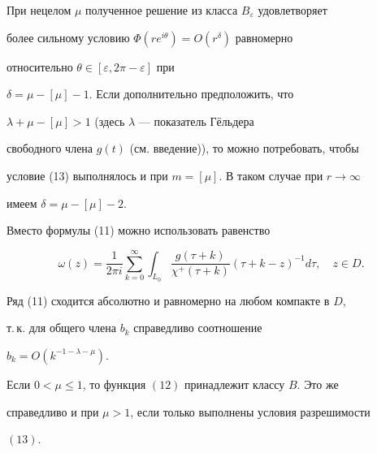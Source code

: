 


 


\begin{note} 


При нецелом $\mu$ полученное решение из класса $B_\varepsilon$ удовлетворяет 


более сильному условию $\Phi(re^{i\theta})=O(r^\delta)$ равномерно 


относительно $\theta\in[\varepsilon,2\pi-\varepsilon]$ при 


$\delta=\mu-[\mu]-1$. Если дополнительно предположить, что 


$\lambda+\mu-[\mu]>1$ (здесь $\lambda$ --- показатель Г\"ельдера 


свободного члена $g(t)$ (см. введение)), то можно потребовать, чтобы 


условие (13) выполнялось и при $m=[\mu]$. В таком случае при $r\to\infty$ 


имеем $\delta=\mu-[\mu]-2$. 


\end{note} 


 


 


\begin{note} 


Вместо формулы (11) можно использовать равенство 


$$ 


\omega(z)=\frac{1}{2\pi i}\sum^\infty_{k=0}\int_{L_0} 


\frac{g(\tau+k)}{\chi^+(\tau+k)}(\tau+k-z)^{-1}d\tau,\quad z\in D. 


$$ 


Ряд (11) сходится абсолютно и равномерно на любом компакте в $D$, 


т.\,к. для общего члена $b_k$ справедливо соотношение 


$b_k=O(k^{-1-\lambda-\mu})$. 


\end{note} 


 


 


\begin{thm} 


Если $0<\mu\le1$, то функция $(12)$ принадлежит классу $B$. Это же 


справедливо и при $\mu>1$, если только выполнены условия разрешимости 


$(13)$. 


\end{thm} 


